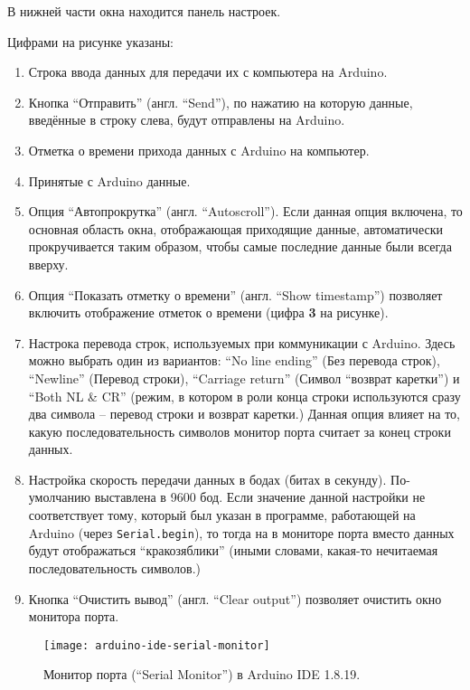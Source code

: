 \documentclass[../sparc.tex]{subfiles}
\begin{document}
В нижней части окна находится панель настроек.

Цифрами на рисунке указаны:
\begin{enumerate}
\item Строка ввода данных для передачи их с компьютера на Arduino.
\item Кнопка ``Отправить'' (англ. ``Send''), по нажатию на которую данные,
  введённые в строку слева, будут отправлены на Arduino.
\item Отметка о времени прихода данных с Arduino на компьютер.
\item Принятые с Arduino данные.
\item Опция ``Автопрокрутка'' (англ. ``Autoscroll'').  Если данная опция
  включена, то основная область окна, отображающая приходящие данные,
  автоматически прокручивается таким образом, чтобы самые последние данные были
  всегда вверху.
\item Опция ``Показать отметку о времени'' (англ. ``Show timestamp'') позволяет
  включить отображение отметок о времени (цифра \textbf{3} на рисунке).
\item Настрока перевода строк, используемых при коммуникации с Arduino.  Здесь
  можно выбрать один из вариантов: ``No line ending'' (Без перевода строк),
  ``Newline'' (Перевод строки), ``Carriage return'' (Символ ``возврат каретки'')
  и ``Both NL \& CR'' (режим, в котором в роли конца строки используются сразу
  два символа -- перевод строки и возврат каретки.)  Данная опция влияет на то,
  какую последовательность символов монитор порта считает за конец строки
  данных.
\item Настройка скорость передачи данных в бодах (битах в секунду).
  По-умолчанию выставлена в 9600 бод.  Если значение данной настройки не
  соответствует тому, который был указан в программе, работающей на Arduino
  (через \texttt{Serial.begin}), то тогда на в мониторе порта вместо данных
  будут отображаться ``кракозяблики'' (иными словами, какая-то нечитаемая
  последовательность символов.)
\item Кнопка ``Очистить вывод'' (англ. ``Clear output'') позволяет очистить окно
  монитора порта.
\end{enumerate}


\begin{figure}[ht]
  \centering
  \texttt{[image: arduino-ide-serial-monitor]}
  \caption{Монитор порта (``Serial Monitor'') в Arduino IDE 1.8.19.}
  \label{fig:arduino-ide-serial-monitor}
\end{figure}
\end{document}
